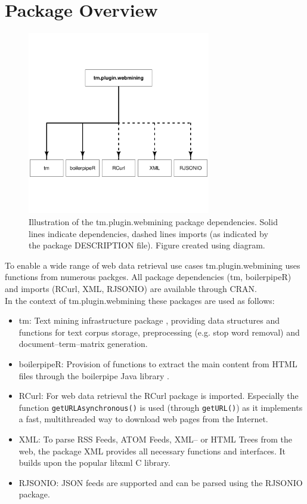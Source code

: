 \documentclass[a4paper]{article}
\newcommand{\code}[1]{\mbox{\texttt{#1}}}
\newcommand{\pkg}[1]{{\normalfont\fontseries{b}\selectfont #1}}
\newcommand{\proglang}[1]{\textsf{#1}}
\newcommand{\fkt}[1]{\code{#1()}}
\begin{document}
\section{Package Overview}
\begin{figure}[tbp]
\centering
\includegraphics[width = 8cm]{webmining-dependenceplot}
\caption{	Illustration of the \pkg{tm.plugin.webmining} package dependencies. Solid lines 
			indicate dependencies, dashed lines imports (as indicated by the package DESCRIPTION file).
			Figure created using \pkg{diagram}.
}
\label{fig:schema_tm.plugin.webmining}
\end{figure}

To enable a wide range of web data retrieval use cases \pkg{tm.plugin.webmining} uses functions
from numerous packges. All package dependencies (\pkg{tm}, \pkg{boilerpipeR}) and imports 
(\pkg{RCurl}, \pkg{XML}, \pkg{RJSONIO}) are available through \proglang{CRAN}.\\
In the context of \pkg{tm.plugin.webmining} these packages are used as follows:

\begin{itemize}
\item \pkg{tm}: Text mining infrastructure package \citep{hornik:Feinerer+Hornik+Meyer:2008}, 
	providing data structures and functions for text corpus storage, preprocessing (e.g. stop word removal)
	and document--term--matrix generation. 
\item \pkg{boilerpipeR}: Provision of functions to extract the main content from \proglang{HTML} files
	through the boilerpipe \proglang{Java} library \citep{kohlschuetter:webextract}.
\item \pkg{RCurl}: For web data retrieval the \pkg{RCurl} package is imported.
	Especially the function \fkt{getURLAsynchronous} is used (through \fkt{getURL})
	as it implements a fast, multithreaded way to download web pages from the Internet.
\item \pkg{XML}: To parse \proglang{RSS} Feeds, \proglang{ATOM} Feeds, \proglang{XML}-- or \proglang{HTML}
	Trees from the web, the package \pkg{XML} \citep{RPack:XML} provides all
	necessary functions and interfaces. It builds upon the popular \pkg{libxml}
	\proglang{C} library.
\item \pkg{RJSONIO}: \proglang{JSON} feeds are supported and can be
parsed using the \pkg{RJSONIO} package.
\end{itemize}
\end{document}
